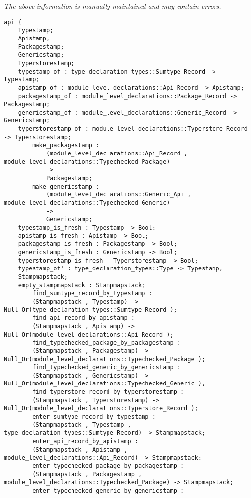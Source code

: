 \label{api:Stampmapstack}

{\tiny \it The above information is manually maintained and may contain errors.}
\begin{verbatim}
api {
    Typestamp;
    Apistamp;
    Packagestamp;
    Genericstamp;
    Typerstorestamp;
    typestamp_of : type_declaration_types::Sumtype_Record -> Typestamp;
    apistamp_of : module_level_declarations::Api_Record -> Apistamp;
    packagestamp_of : module_level_declarations::Package_Record -> Packagestamp;
    genericstamp_of : module_level_declarations::Generic_Record -> Genericstamp;
    typerstorestamp_of : module_level_declarations::Typerstore_Record -> Typerstorestamp;
        make_packagestamp :
            (module_level_declarations::Api_Record , module_level_declarations::Typechecked_Package)
            ->
            Packagestamp;
        make_genericstamp :
            (module_level_declarations::Generic_Api , module_level_declarations::Typechecked_Generic)
            ->
            Genericstamp;
    typestamp_is_fresh : Typestamp -> Bool;
    apistamp_is_fresh : Apistamp -> Bool;
    packagestamp_is_fresh : Packagestamp -> Bool;
    genericstamp_is_fresh : Genericstamp -> Bool;
    typerstorestamp_is_fresh : Typerstorestamp -> Bool;
    typestamp_of' : type_declaration_types::Type -> Typestamp;
    Stampmapstack;
    empty_stampmapstack : Stampmapstack;
        find_sumtype_record_by_typestamp :
        (Stampmapstack , Typestamp) -> Null_Or(type_declaration_types::Sumtype_Record );
        find_api_record_by_apistamp :
        (Stampmapstack , Apistamp) -> Null_Or(module_level_declarations::Api_Record );
        find_typechecked_package_by_packagestamp :
        (Stampmapstack , Packagestamp) -> Null_Or(module_level_declarations::Typechecked_Package );
        find_typechecked_generic_by_genericstamp :
        (Stampmapstack , Genericstamp) -> Null_Or(module_level_declarations::Typechecked_Generic );
        find_typerstore_record_by_typerstorestamp :
        (Stampmapstack , Typerstorestamp) -> Null_Or(module_level_declarations::Typerstore_Record );
        enter_sumtype_record_by_typestamp :
        (Stampmapstack , Typestamp , type_declaration_types::Sumtype_Record) -> Stampmapstack;
        enter_api_record_by_apistamp :
        (Stampmapstack , Apistamp , module_level_declarations::Api_Record) -> Stampmapstack;
        enter_typechecked_package_by_packagestamp :
        (Stampmapstack , Packagestamp , module_level_declarations::Typechecked_Package) -> Stampmapstack;
        enter_typechecked_generic_by_genericstamp :

\end{verbatim}
